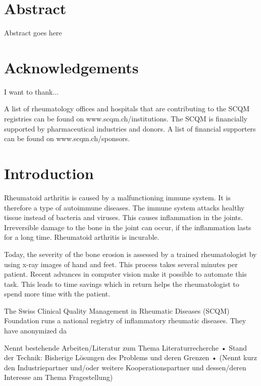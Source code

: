 \documentclass[12pt]{article}
\begin{document}
\newpage

\section*{Abstract}
Abstract goes here

\newpage

\section*{Acknowledgements}
I want to thank...

A list of rheumatology offices and hospitals that are contributing to the SCQM registries can be found on www.scqm.ch/institutions. The SCQM is financially supported by pharmaceutical industries and donors. A list of financial supporters can be found on www.scqm.ch/sponsors.

\newpage

\tableofcontents

\newpage

\section{Introduction}

Rheumatoid arthritis is caused by a malfunctioning immune system. It is therefore a type of autoimmune diseases. The immune system attacks healthy tissue instead of bacteria and viruses. This causes inflammation in the joints. Irreversible damage to the bone in the joint can occur, if the inflammation lasts for a long time. \cite{rheuma} Rheumatoid arthritis is incurable.

Today, the severity of the bone erosion is assessed by a trained rheumatologist by using x-ray images of hand and feet. This process takes several minutes per patient. Recent advances in computer vision make it possible to automate this task. This leads to time savings which in return helps the rheumatologist to spend more time with the patient.

The Swiss Clinical Quality Management in Rheumatic Diseases (SCQM) Foundation runs a national registry of inflammatory rheumatic diseases. They have anonymized da

\cite{scqm_about} 




Nennt bestehende Arbeiten/Literatur zum Thema Literaturrecherche • Stand der Technik: Bisherige Lösungen des Problems und deren Grenzen • (Nennt kurz den Industriepartner und/oder weitere Kooperationspartner und dessen/deren Interesse am Thema Fragestellung) 
\end{document}
